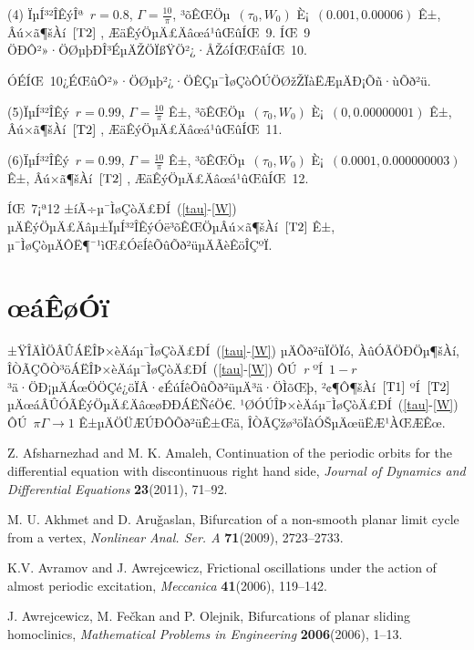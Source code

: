 \documentclass[12pt,openany,CJK,oneside]{cctbook}
\begin{document}
{(4) ÏµÍ³²ÎÊýÎª\ $r=0.8$, $\Gamma=\frac{10}{\pi}$, ³õÊŒÖµ\ $(\tau_0,W_0)$ È¡\ $(0.001,0.00006)$ Ê±, Âú×ã¶šÀí\ $\ref{T2}$ , ÆäÊýÖµÄ£Äâœá¹ûŒûÍŒ\ 9.
ÍŒ\ 9 ÖÐÔ²»·ÖØµþÐÎ³ÉµÄŽÖÏßŸÖ²¿·ÅŽóÍŒŒûÍŒ\ 10.

ÓÉÍŒ\ 10¿ÉŒûÔ²»·ÖØµþ²¿·ÖÊÇµ¯ÌøÇòÔÚÖØžŽÏàËÆµÄÐ¡Õñ·ùÕð²ü.

(5)ÏµÍ³²ÎÊý\ $r=0.99$, $\Gamma=\frac{10}{\pi}$ Ê±, ³õÊŒÖµ\ $(\tau_0,W_0)$ È¡\ $(0,0.00000001)$ Ê±, Âú×ã¶šÀí\ $\ref{T2}$ , ÆäÊýÖµÄ£Äâœá¹ûŒûÍŒ\  11.

(6)ÏµÍ³²ÎÊý\ $r=0.99$, $\Gamma=\frac{10}{\pi}$ Ê±, ³õÊŒÖµ\ $(\tau_0,W_0)$ È¡\ $(0.0001,0.000000003)$ Ê±, Âú×ã¶šÀí\ $\ref{T2}$ , ÆäÊýÖµÄ£Äâœá¹ûŒûÍŒ\  12.

ÍŒ\ 7¡ª12 ±íÃ÷µ¯ÌøÇòÄ£ÐÍ\ (\ref{tau}-\ref{W}) µÄÊýÖµÄ£Äâµ±ÏµÍ³²ÎÊýÓë³õÊŒÖµÂú×ã¶šÀí\ $\ref{T2}$ Ê±, µ¯ÌøÇòµÄÔË¶¯¹ìŒ£ÓëÍêÕûÕð²üµÄÃèÊöÎÇºÏ.


\chapter{\heiti œáÊøÓï}\label{chapterend}

±ŸÎÄÌÖÂÛÁËÎÞ×èÄáµ¯ÌøÇòÄ£ÐÍ\ (\ref{tau}-\ref{W}) µÄÕð²üÏÖÏó, ÀûÓÃÖÐÖµ¶šÀí, ÎÒÃÇÕÒ³öÁËÎÞ×èÄáµ¯ÌøÇòÄ£ÐÍ\ (\ref{tau}-\ref{W}) ÔÚ\ \emph{r} ºÍ\ $1-r$ ³ä·ÖÐ¡µÄÁœÖÖÇé¿öÏÂ·¢ÉúÍêÕûÕð²üµÄ³ä·ÖÌõŒþ, ²¢¶Ô¶šÀí\ $\ref{T1}$ ºÍ\ $\ref{T2}$ µÄœáÂÛÓÃÊýÖµÄ£ÄâœøÐÐÁËÑéÖ€. ¹ØÓÚÎÞ×èÄáµ¯ÌøÇòÄ£ÐÍ\ (\ref{tau}-\ref{W}) ÔÚ\ $\pi\Gamma\rightarrow1$ Ê±µÄÖÜÆÚÐÔÕð²üÊ±Œä, ÎÒÃÇžø³öÏàÓŠµÄœüËÆ¹ÀŒÆÊœ.


{\footnotesize
\begin{thebibliography}{999}

Z. Afsharnezhad and M. K. Amaleh, Continuation of the periodic orbits for the differential equation with discontinuous right hand side, {\it  Journal of Dynamics and Differential Equations} {\bf 23}(2011), 71--92.

M. U. Akhmet and D. Aru\v{g}aslan, Bifurcation of a non-smooth planar limit cycle from a vertex, {\it Nonlinear Anal. Ser. A} {\bf 71}(2009), 2723--2733.

 K.V. Avramov and J. Awrejcewicz, Frictional oscillations under the action of almost periodic excitation,
{\it Meccanica} {\bf 41}(2006), 119--142.

 J. Awrejcewicz, M. Fe\v{c}kan and P. Olejnik,
       Bifurcations of planar sliding homoclinics, {\it Mathematical Problems in Engineering} {\bf 2006}(2006), 1--13.


\end{thebibliography}}}
\end{document}
